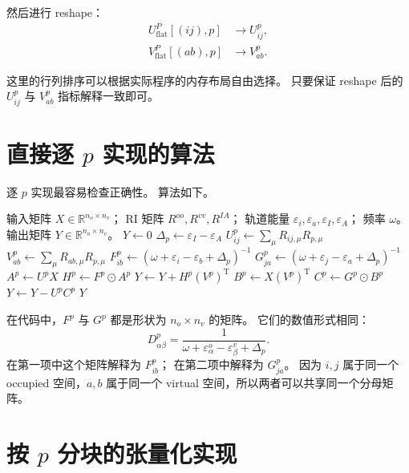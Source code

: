 \documentclass[UTF8,a4paper,11pt]{ctexart}
\newcommand{\eps}{\varepsilon}
\newcommand{\Roo}{R^{oo}}
\newcommand{\Rvv}{R^{vv}}
\newcommand{\Ria}{R^{IA}}
\newcommand{\Had}{\odot}
\newcommand{\trans}{\mathrm{T}}
\begin{document}
然后进行 reshape：
\begin{align}
U_{\mathrm{flat}}^P[(ij),p]
&\longrightarrow
U^p_{ij},
\\
V_{\mathrm{flat}}^P[(ab),p]
&\longrightarrow
V^p_{ab}.
\end{align}

这里的行列排序可以根据实际程序的内存布局自由选择。
只要保证 reshape 后的 $U^p_{ij}$ 与 $V^p_{ab}$ 指标解释一致即可。

\section{直接逐 $p$ 实现的算法}

逐 $p$ 实现最容易检查正确性。
算法如下。

\begin{algorithm}[H]
\caption{逐 $p=(I,A)$ 的 RI-matvec 实现}
\begin{algorithmic}[1]
\Require 输入矩阵 $X\in\mathbb{R}^{n_o\times n_v}$；
         RI 矩阵 $\Roo,\Rvv,\Ria$；
         轨道能量 $\eps_i,\eps_a,\eps_I,\eps_A$；
         频率 $\omega$。
\Ensure 输出矩阵 $Y\in\mathbb{R}^{n_o\times n_v}$。
\State $Y\gets 0$
    \State $\Delta_p\gets \eps_I-\eps_A$
    \State $U^p_{ij}\gets \sum_{\mu}R_{ij,\mu}R_{p,\mu}$
    \State $V^p_{ab}\gets \sum_{\mu}R_{ab,\mu}R_{p,\mu}$
    \State $F^p_{ib}\gets \left(\omega+\eps_i-\eps_b+\Delta_p\right)^{-1}$
    \State $G^p_{ja}\gets \left(\omega+\eps_j-\eps_a+\Delta_p\right)^{-1}$
    \State $A^p\gets U^pX$
    \State $H^p\gets F^p\Had A^p$
    \State $Y\gets Y+H^p(V^p)^{\trans}$
    \State $B^p\gets X(V^p)^{\trans}$
    \State $C^p\gets G^p\Had B^p$
    \State $Y\gets Y-U^pC^p$
\EndFor
\State \Return $Y$
\end{algorithmic}
\end{algorithm}

在代码中，$F^p$ 与 $G^p$ 都是形状为 $n_o\times n_v$ 的矩阵。
它们的数值形式相同：
\begin{equation}
D^p_{\alpha\beta}
=
\frac{1}{\omega+\eps_{\alpha}^{o}-\eps_{\beta}^{v}+\Delta_p}.
\end{equation}
在第一项中这个矩阵解释为 $F^p_{ib}$；
在第二项中解释为 $G^p_{ja}$。
因为 $i,j$ 属于同一个 occupied 空间，$a,b$ 属于同一个 virtual 空间，所以两者可以共享同一个分母矩阵。

\section{按 $p$ 分块的张量化实现}
\end{document}
